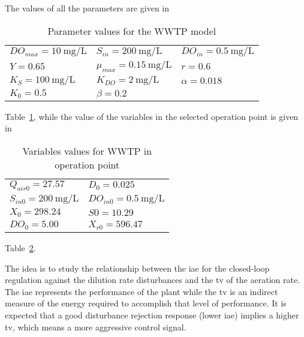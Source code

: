 The values of all the parameters are given in %
\begin{table}[tb]
	\centering
	\caption{Parameter values for the WWTP model}
	\begin{tabular}{lll}
		\toprule
		$DO_{max} = \SI{10}{\milli\gram\per\liter}$ & $S_{in} = \SI{200}{\milli\gram\per\liter}$ & $DO_{in} = \SI{0.5}{\milli\gram\per\liter}$\\
		$Y = 0.65$ & $\mu_{max} = \SI{0.15}{\milli\gram\per\liter}$ & $r = 0.6$ \\
		$K_S = \SI{100}{\milli\gram\per\liter}$ & $K_{DO} = \SI{2}{\milli\gram\per\liter}$ & $\alpha = 0.018$ \\
		$K_0 = 0.5$ & $\beta = 0.2$\\
		\bottomrule
	\end{tabular}
	\label{tab:ParamValues}
\end{table}
%
Table~\ref{tab:ParamValues}, while the value of the variables in the selected operation point is given in %
%
\begin{table}[tb]
	\centering
	\caption{Variables values for WWTP in operation point}
	\begin{tabular}{ll}
		\toprule
		$Q_{air0} = 27.57$ & $D_0 =  0.025$ \\
		$S_{in0} = \SI{200}{\milli\gram\per\liter}$ & $DO_{in0} = \SI{0.5}{\milli\gram\per\liter}$\\
		$X_0 = 298.24$ & $S0 = 10.29$\\
		$DO_0 = 5.00$ & $X_{r0} = 596.47$\\
		\bottomrule
	\end{tabular}
	\label{tab:WTPOP}
\end{table}
%
Table~\ref{tab:WTPOP}.

The idea is to study the relationship between the \gls{iae} for the closed-loop regulation against the dilution rate disturbances and the \gls{tv} of the aeration rate. The \gls{iae} represents the performance of the plant while the \gls{tv} is an indirect measure of the energy required to accomplish that level of performance. It is expected that a good disturbance rejection response (lower \gls{iae}) implies a higher \gls{tv}, which means a more aggressive control signal.

